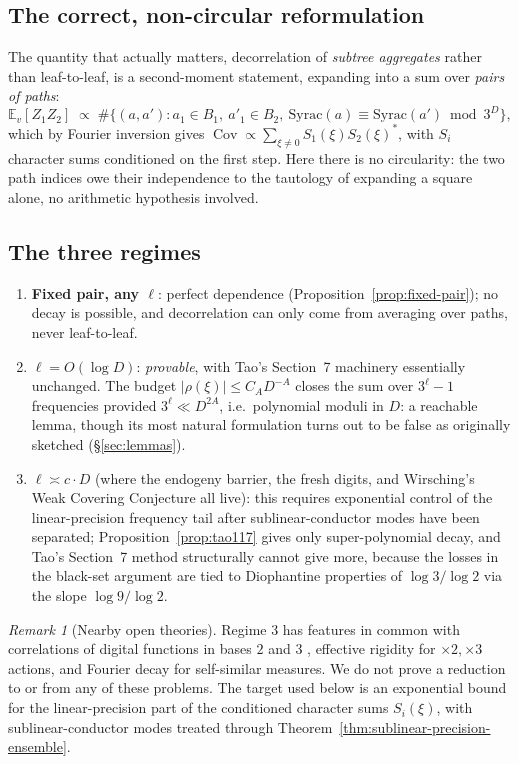 \documentclass[11pt]{article}
\theoremstyle{definition}
\theoremstyle{remark}
\newtheorem{remark}[theorem]{Remark}
\DeclareMathOperator{\Cov}{Cov}
\begin{document}
\subsection{The correct, non-circular reformulation}

The quantity that actually matters, decorrelation of \emph{subtree
aggregates} rather than leaf-to-leaf, is a second-moment statement,
expanding into a sum over \emph{pairs of paths}:
\[
  \mathbb{E}_v[Z_1 Z_2] \;\propto\; \#\{(a,a') : a_1\in B_1,\ a'_1\in
  B_2,\ \mathrm{Syrac}(a)\equiv\mathrm{Syrac}(a') \bmod 3^D\},
\]
which by Fourier inversion gives $\Cov \propto \sum_{\xi\ne 0}
S_1(\xi)S_2(\xi)^\ast$, with $S_i$ character sums conditioned on the
first step. Here there is no circularity: the two path indices owe
their independence to the tautology of expanding a square alone, no
arithmetic hypothesis involved.

\subsection{The three regimes}

\begin{enumerate}
\item \textbf{Fixed pair, any $\ell$}: perfect dependence
  (Proposition~\ref{prop:fixed-pair}); no decay is possible, and
  decorrelation can only come from averaging over paths, never
  leaf-to-leaf.
\item \textbf{$\ell = O(\log D)$}: \emph{provable}, with Tao's
  Section~7 machinery essentially unchanged. The budget
  $|\rho(\xi)|\le C_A D^{-A}$ closes the sum over $3^\ell-1$
  frequencies provided $3^\ell \ll D^{2A}$, i.e.\ polynomial moduli in
  $D$: a reachable lemma, though its most natural
  formulation turns out to be false as originally sketched
  (\S\ref{sec:lemmas}).
\item \textbf{$\ell \asymp c\cdot D$} (where the endogeny barrier, the
  fresh digits, and Wirsching's Weak Covering Conjecture all live):
  this requires exponential control of the linear-precision
  frequency tail after sublinear-conductor modes have been separated;
  Proposition~\ref{prop:tao117} gives only
  super-polynomial decay, and Tao's Section~7 method structurally
  cannot give more, because the losses in the black-set argument are
  tied to Diophantine properties of $\log 3/\log 2$ via the slope
  $\log 9/\log 2$.
\end{enumerate}

\begin{remark}[Nearby open theories]\label{thm:regime3}
Regime 3 has features in common with correlations of digital functions
in bases $2$ and $3$ \cite{Spiegelhofer2021}, effective rigidity for
$\times2,\times3$ actions, and Fourier decay for self-similar measures.
We do not prove a reduction to or from any of these problems. The target
used below is an exponential bound for the linear-precision part of the
conditioned character sums $S_i(\xi)$, with sublinear-conductor modes
treated through Theorem~\ref{thm:sublinear-precision-ensemble}.
\end{remark}
\end{document}
